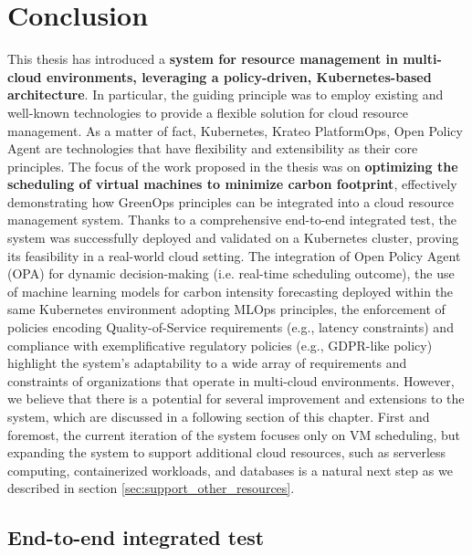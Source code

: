 \chapter{Conclusion}
\label{cha:conclusion}

This thesis has introduced a \textbf{system for resource management in multi-cloud environments, leveraging a policy-driven, Kubernetes-based architecture}. 
In particular, the guiding principle was to employ existing and well-known technologies to provide a flexible solution for cloud resource management.
As a matter of fact, Kubernetes, Krateo PlatformOps, Open Policy Agent are technologies that have flexibility and extensibility as their core principles.
The focus of the work proposed in the thesis was on \textbf{optimizing the scheduling of virtual machines to minimize carbon footprint}, effectively demonstrating how GreenOps principles can be integrated into a cloud resource management system.
Thanks to a comprehensive end-to-end integrated test, the system was successfully deployed and validated on a Kubernetes cluster, proving its feasibility in a real-world cloud setting.
The integration of Open Policy Agent (OPA) for dynamic decision-making (i.e. real-time scheduling outcome), the use of machine learning models for carbon intensity forecasting deployed within the same Kubernetes environment adopting MLOps principles, the enforcement of policies encoding Quality-of-Service requirements (e.g., latency constraints) and compliance with exemplificative regulatory policies (e.g., GDPR-like policy) highlight the system’s adaptability to a wide array of requirements and constraints of organizations that operate in multi-cloud environments.
However, we believe that there is a potential for several improvement and extensions to the system, which are discussed in a following section of this chapter.
First and foremost, the current iteration of the system focuses only on VM scheduling, but expanding the system to support additional cloud resources, such as serverless computing, containerized workloads, and databases is a natural next step as we described in section \ref{sec:support_other_resources}.

\section{End-to-end integrated test}

